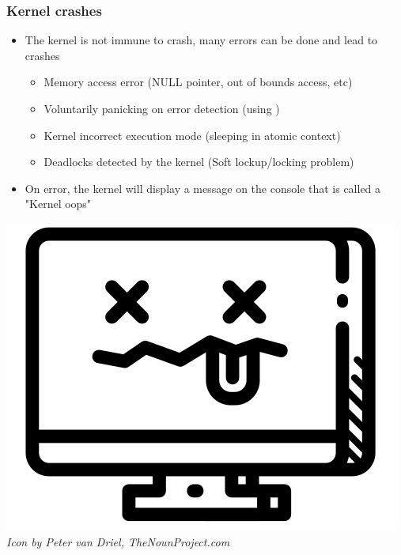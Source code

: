 \begin{frame}
  \frametitle{Kernel crashes}
  \begin{itemize}
    \item The kernel is not immune to crash, many errors can be done and lead to
          crashes
    \begin{itemize}
      \item Memory access error (NULL pointer, out of bounds access, etc)
      \item Voluntarily panicking on error detection (using )
      \item Kernel incorrect execution mode (sleeping in atomic context)
      \item Deadlocks detected by the kernel (Soft lockup/locking problem)
    \end{itemize}
    \item On error, the kernel will display a message on the console that
          is called a "Kernel oops"
  \end{itemize}
  \begin{center}
    \center\includegraphics[height=0.3\textheight]{slides/debugging-kernel-debugging/crash.png}\\
    {\tiny {\em Icon by Peter van Driel, TheNounProject.com}}
  \end{center}
\end{frame}

